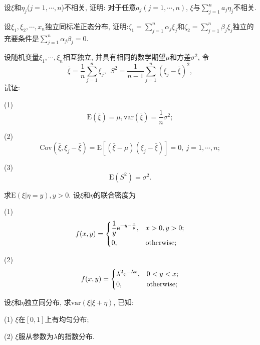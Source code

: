 \begin{yyEx}
	设$\xi$和$\eta_j$($j=1,\cdots,n$)不相关, 证明: 对于任意$a_j(j=1,\cdots,n)$, $\xi$与$\sum\limits_{j=1}^na_j\eta_j$不相关.
\end{yyEx}

\begin{yyEx}
	设$\xi_1,\xi_2,\cdots,x_n$独立同标准正态分布, 证明:$\zeta_1=\sum\limits_{j=1}^n\alpha_j\xi_j$和$\zeta_2=\sum\limits_{j=1}^n\beta_j\xi_j$独立的充要条件是$\sum\limits_{j=1}^n\alpha_j\beta_j = 0$.
\end{yyEx}

\begin{yyEx}
	设随机变量$\xi_1,\cdots,\xi_n$相互独立, 并具有相同的数学期望$\mu$和方差$\sigma^2$, 令\begin{equation}
	\bar{\xi} = \frac{1}{n}\sum_{j=1}^n\xi_j,~~S^2 = \frac{1}{n-1}\sum_{j=1}^n(\xi_j-\bar{\xi})^2,
	\end{equation}
	试证:\begin{blist}
		\item[(1)] \begin{equation}
		\mathrm{E}(\bar{\xi}) = \mu,\mathrm{var}(\bar{\xi}) = \frac{1}{n}\sigma^2;
		\end{equation}
		\item[(2)] \begin{equation}
		\mathrm{Cov}(\bar{\xi},\xi_j-\bar{\xi})=\mathrm{E}\left[ (\bar{\xi}-\mu)(\xi_j-\bar{\xi}) \right] = 0,~j=1,\cdots,n;
		\end{equation}
		\item[(3)] \begin{equation}
		\mathrm{E}(S^2) = \sigma^2.
		\end{equation}
	\end{blist}
\end{yyEx}

\begin{yyEx}
	求$\mathrm{E}(\xi|\eta=y),y>0$. 设$\xi$和$\eta$的联合密度为
	\begin{blist}
		\item[(1)] \begin{equation}
		f(x,y) = \begin{dcases}
		\frac{1}{y}\mathrm{e}^{-y-\frac{x}{y}}, &x>0,y>0;\\
		0,&\text{otherwise};
		\end{dcases}
		\end{equation}
		\item[(2)] \begin{equation}
		f(x,y) = \begin{dcases}
		\lambda^2\mathrm{e}^{-\lambda x}, &0<y<x;\\
		0,&\text{otherwise};
		\end{dcases}
		\end{equation}
	\end{blist}
	
\end{yyEx}

\begin{yyEx}
	设$\xi$和$\eta$独立同分布, 求$\mathrm{var}(\xi|\xi+\eta)$, 已知:
	\begin{blist}
		\item[(1)] $\xi$在$[0,1]$上有均匀分布;
		\item[(2)] $\xi$服从参数为$\lambda$的指数分布.
	\end{blist}
\end{yyEx}
